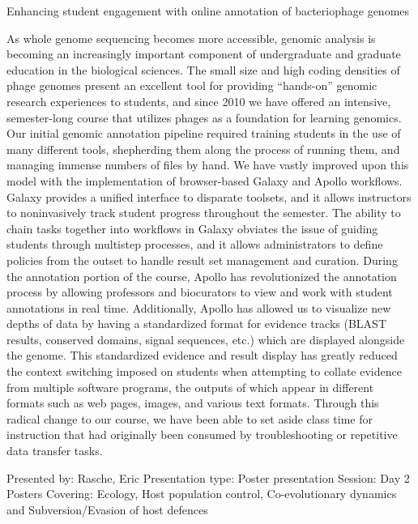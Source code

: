 Enhancing student engagement with online annotation of bacteriophage genomes

As whole genome sequencing becomes more accessible, genomic analysis is
becoming an increasingly important component of undergraduate and graduate
education in the biological sciences. The small size and high coding
densities of phage genomes present an excellent tool for providing
“hands-on” genomic research experiences to students, and since 2010 we
have offered an intensive, semester-long course that utilizes phages as a
foundation for learning genomics. Our initial genomic annotation pipeline
required training students in the use of many different tools, shepherding
them along the process of running them, and managing immense numbers of
files by hand. We have vastly improved upon this model with the
implementation of browser-based Galaxy and Apollo workflows. Galaxy
provides a unified interface to disparate toolsets, and it allows
instructors to noninvasively track student progress throughout the
semester. The ability to chain tasks together into workflows in Galaxy
obviates the issue of guiding students through multistep processes, and it
allows administrators to define policies from the outset to handle result
set management and curation. During the annotation portion of the course,
Apollo has revolutionized the annotation process by allowing professors
and biocurators to view and work with student annotations in real time.
Additionally, Apollo has allowed us to visualize new depths of data by
having a standardized format for evidence tracks (BLAST results, conserved
domains, signal sequences, etc.) which are displayed alongside the genome.
This standardized evidence and result display has greatly reduced the
context switching imposed on students when attempting to collate evidence
from multiple software programs, the outputs of which appear in different
formats such as web pages, images, and various text formats. Through this
radical change to our course, we have been able to set aside class time
for instruction that had originally been consumed by troubleshooting or
repetitive data transfer tasks.

Presented by: Rasche, Eric
Presentation type: Poster presentation
Session: Day 2 Posters Covering: Ecology, Host population control, Co-evolutionary dynamics and Subversion/Evasion of host defences
